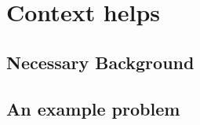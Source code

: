 \section{Context helps \name}

\subsection{Necessary Background}

\subsection{An example problem}


